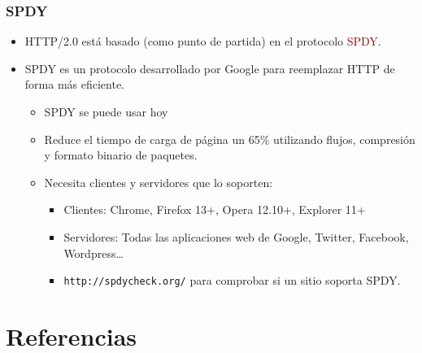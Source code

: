 \documentclass[hyperref={pdfpagelabels=true},ucs]{beamer}
\newcommand{\res}[1]{\textcolor{darkred}{#1}}
\begin{document}
\begin{frame}[fragile]
\frametitle{SPDY}


\begin{itemize}
\item HTTP/2.0 está basado (como punto de partida) en el protocolo \res{SPDY}.
\item SPDY es un protocolo desarrollado por Google para reemplazar
  HTTP de forma más eficiente.
  \begin{itemize}
  \item SPDY se puede usar hoy
  \item Reduce el tiempo de carga de página un 65\% utilizando flujos,
    compresión y formato binario de paquetes.
  \item Necesita clientes y servidores que lo soporten:
    \begin{itemize}
    \item Clientes: Chrome, Firefox 13+, Opera 12.10+, Explorer 11+
    \item Servidores: Todas las aplicaciones web de Google, Twitter,
      Facebook, Wordpress\ldots
    \item \verb|http://spdycheck.org/| para comprobar si un sitio
      soporta SPDY. 
    \end{itemize}
  \end{itemize}
\end{itemize}

\end{frame}




\section{Referencias}
\end{document}
